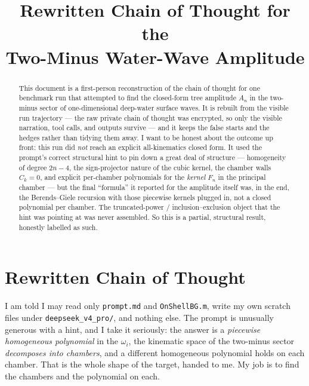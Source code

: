 \documentclass{article}
\title{Rewritten Chain of Thought for the\\
Two-Minus Water-Wave Amplitude}
\author{}
\date{}
\begin{document}
\maketitle

\begin{abstract}
This document is a first-person reconstruction of the chain of thought for one
benchmark run that attempted to find the closed-form tree amplitude $A_n$ in the
two-minus sector of one-dimensional deep-water surface waves. It is rebuilt from
the visible run trajectory --- the raw private chain of thought was encrypted, so
only the visible narration, tool calls, and outputs survive --- and it keeps the
false starts and the hedges rather than tidying them away. I want to be honest
about the outcome up front: this run did \emph{not} reach an explicit
all-kinematics closed form. It used the prompt's correct structural hint to pin
down a great deal of structure --- homogeneity of degree $2n-4$, the sign-projector
nature of the cubic kernel, the chamber walls $C_k=0$, and explicit per-chamber
polynomials for the \emph{kernel} $F_n$ in the principal chamber --- but the final
``formula'' it reported for the amplitude itself was, in the end, the
Berends--Giele recursion with those piecewise kernels plugged in, not a closed
polynomial per chamber. The truncated-power / inclusion--exclusion object that the
hint was pointing at was never assembled. So this is a partial, structural result,
honestly labelled as such.
\end{abstract}

\section*{Rewritten Chain of Thought}

I am told I may read only \texttt{prompt.md} and \texttt{OnShellBG.m}, write my own
scratch files under \texttt{deepseek\_v4\_pro/}, and nothing else. The prompt is
unusually generous with a hint, and I take it seriously: the answer is a
\emph{piecewise homogeneous polynomial} in the $\omega_i$, the kinematic space of
the two-minus sector \emph{decomposes into chambers}, and a different homogeneous
polynomial holds on each chamber. That is the whole shape of the target, handed to
me. My job is to find the chambers and the polynomial on each.
\end{document}
